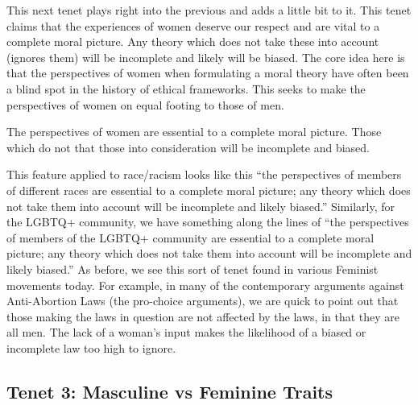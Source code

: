 This next tenet plays right into the previous and adds a little bit to it. This tenet claims that the experiences of women deserve our respect and are vital to a complete moral picture. Any theory which does not take these into account (ignores them) will be incomplete and likely will be biased. The core idea here is that the perspectives of women when formulating a moral theory have often been a blind spot in the history of ethical frameworks. This seeks to make the perspectives of women on equal footing to those of men.
\begin{center}
The perspectives of women are essential to a complete moral picture. Those which do not that those into consideration will be incomplete and biased.
\end{center}
This feature applied to race/racism looks like this “the perspectives of members of different races are essential to a complete moral picture; any theory which does not take them into account will be incomplete and likely biased.” Similarly, for the LGBTQ+ community, we have something along the lines of “the perspectives of members of the LGBTQ+ community are essential to a complete moral picture; any theory which does not take them into account will be incomplete and likely biased.” As before, we see this sort of tenet found in various Feminist movements today. For example, in many of the contemporary arguments against Anti-Abortion Laws (the pro-choice arguments), we are quick to point out that those making the laws in question are not affected by the laws, in that they are all men. The lack of a woman's input makes the likelihood of a biased or incomplete law too high to ignore. 

\subsection{Tenet 3: Masculine vs Feminine Traits}

